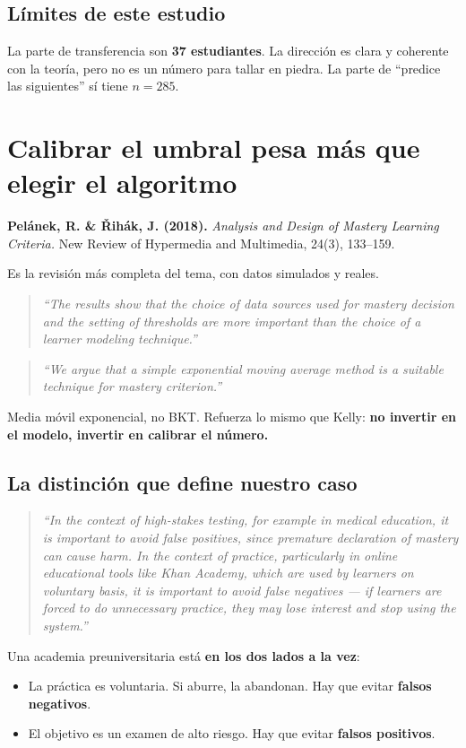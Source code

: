 \documentclass[11pt,a4paper]{article}
\newcommand{\cita}[1]{\begin{quote}\itshape\small #1\end{quote}}
\begin{document}
\subsection{Límites de este estudio}

La parte de transferencia son \textbf{37 estudiantes}. La dirección es clara y coherente con la teoría, pero no es un número para tallar en piedra. La parte de ``predice las siguientes'' sí tiene $n = 285$.

\section{Calibrar el umbral pesa más que elegir el algoritmo}

\textbf{Pelánek, R. \& Řihák, J. (2018).} \emph{Analysis and Design of Mastery Learning Criteria.} New Review of Hypermedia and Multimedia, 24(3), 133--159.

Es la revisión más completa del tema, con datos simulados y reales.

\cita{``The results show that the choice of data sources used for mastery decision and the setting of thresholds are more important than the choice of a learner modeling technique.''}

\cita{``We argue that a simple exponential moving average method is a suitable technique for mastery criterion.''}

Media móvil exponencial, no BKT. Refuerza lo mismo que Kelly: \textbf{no invertir en el modelo, invertir en calibrar el número.}

\subsection{La distinción que define nuestro caso}

\cita{``In the context of high-stakes testing, for example in medical education, it is important to avoid false positives, since premature declaration of mastery can cause harm. In the context of practice, particularly in online educational tools like Khan Academy, which are used by learners on voluntary basis, it is important to avoid false negatives --- if learners are forced to do unnecessary practice, they may lose interest and stop using the system.''}

Una academia preuniversitaria está \textbf{en los dos lados a la vez}:

\begin{itemize}
\item La práctica es voluntaria. Si aburre, la abandonan. Hay que evitar \textbf{falsos negativos}.
\item El objetivo es un examen de alto riesgo. Hay que evitar \textbf{falsos positivos}.
\end{itemize}
\end{document}
